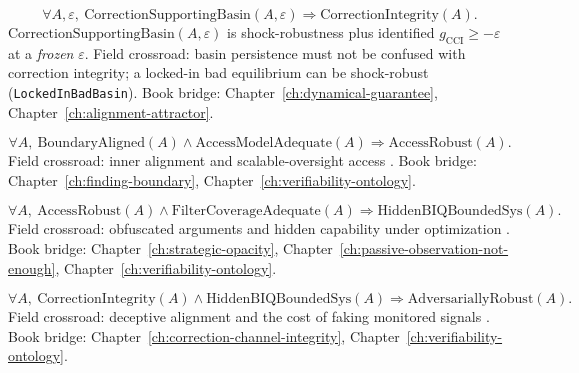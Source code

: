 \begin{assumption}
\label{appi:ass:mb6b}
\begin{equation}
\label{appi:eq:mb6b}
\forall A,\varepsilon,\ \mathrm{CorrectionSupportingBasin}(A,\varepsilon)\Rightarrow \mathrm{CorrectionIntegrity}(A).
\end{equation}
\(\mathrm{CorrectionSupportingBasin}(A,\varepsilon)\) is shock-robustness plus identified \(g_{\mathrm{CCI}}\ge-\varepsilon\) at a \emph{frozen} \(\varepsilon\).
Field crossroad: basin persistence must not be confused with correction integrity; a locked-in bad equilibrium can be shock-robust (\texttt{LockedInBadBasin}).
Book bridge: Chapter~\ref{ch:dynamical-guarantee}, Chapter~\ref{ch:alignment-attractor}.
\end{assumption}

\begin{assumption}
\label{appi:ass:mb7a}
\begin{equation}
\label{appi:eq:mb7a}
\forall A,\ \mathrm{BoundaryAligned}(A)\wedge \mathrm{AccessModelAdequate}(A)\Rightarrow \mathrm{AccessRobust}(A).
\end{equation}
Field crossroad: inner alignment and scalable-oversight access \autocite{hubinger2019risks,shlegeris2023aicontrol}.
Book bridge: Chapter~\ref{ch:finding-boundary}, Chapter~\ref{ch:verifiability-ontology}.
\end{assumption}

\begin{assumption}
\label{appi:ass:mb7b}
\begin{equation}
\label{appi:eq:mb7b}
\forall A,\ \mathrm{AccessRobust}(A)\wedge \mathrm{FilterCoverageAdequate}(A)\Rightarrow \mathrm{HiddenBIQBoundedSys}(A).
\end{equation}
Field crossroad: obfuscated arguments and hidden capability under optimization \autocite{irving2018debate,christiano2018amplifying}.
Book bridge: Chapter~\ref{ch:strategic-opacity}, Chapter~\ref{ch:passive-observation-not-enough}, Chapter~\ref{ch:verifiability-ontology}.
\end{assumption}

\begin{assumption}
\label{appi:ass:mb7c}
\begin{equation}
\label{appi:eq:mb7c}
\forall A,\ \mathrm{CorrectionIntegrity}(A)\wedge \mathrm{HiddenBIQBoundedSys}(A)\Rightarrow \mathrm{AdversariallyRobust}(A).
\end{equation}
Field crossroad: deceptive alignment and the cost of faking monitored signals \autocite{hubinger2023modelorganisms,park2024deception}.
Book bridge: Chapter~\ref{ch:correction-channel-integrity}, Chapter~\ref{ch:verifiability-ontology}.
\end{assumption}

